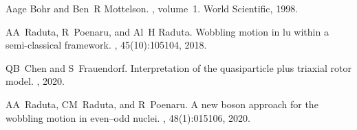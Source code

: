 \documentclass{rjparticle}
\begin{document}
\begin{thebibliography}{1}

Aage Bohr and Ben~R Mottelson.
, volume~1.
\newblock World Scientific, 1998.

AA~Raduta, R~Poenaru, and Al~H Raduta.
\newblock Wobbling motion in lu within a semi-classical framework.
,
  45(10):105104, 2018.

QB~Chen and S~Frauendorf.
\newblock Interpretation of the quasiparticle plus triaxial rotor model.
, 2020.

AA~Raduta, CM~Raduta, and R~Poenaru.
\newblock A new boson approach for the wobbling motion in even--odd nuclei.
,
  48(1):015106, 2020.

\end{thebibliography}
\end{document}
